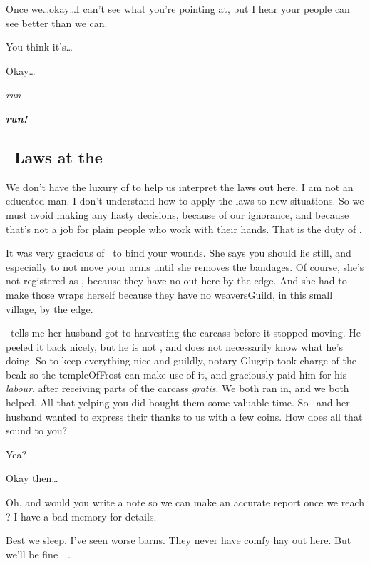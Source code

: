 Once we\ldots okay\ldots I can't see what you're pointing at, but I hear your people can see better than we can.

You think it's\ldots

\noindent
Okay\ldots

\hspace{3em}\emph{run-}

\hspace{6em}\emph{\bfseries run!}

\subsection{~Laws at the }

We don't have the luxury of  to help us interpret the laws out here.
I am not an educated man.
I don't understand how to apply the laws to new situations.
So we must avoid making any hasty decisions, because of our ignorance, and because that's not a job for plain people who work with their hands.
That is the duty of .

It was very gracious of \composeHumanName\ to bind your wounds.
She says you should lie still, and especially to not move your arms until she removes the bandages.
Of course, she's not registered as , because they have no  out here by the \gls{edge}.
And she had to make those wraps herself because they have no \gls{weaversGuild}, in this small \gls{village}, by the \gls{edge}.

\currentName\ tells me her husband got to \gls{harvesting} the carcass before it stopped moving.
He peeled it back nicely, but he is not , and does not necessarily know what he's doing.
So to keep everything nice and guildly, \Gls{notary} Glugrip took charge of the beak so the \gls{templeOfFrost} can make use of it, and graciously paid him for his \emph{labour}, after receiving parts of the carcass \emph{gratis}.
We both ran in, and we both helped.
All that yelping you did bought them some valuable time.
So \currentName\ and her husband wanted to express their thanks to us with a few \glspl{coin}.
How does all that sound to you?

Yea?

Okay then\ldots

Oh, and would you write a note so we can make an accurate report once we reach ?
I have a bad memory for details.

Best we sleep.
I've seen worse barns.
{
  \small
  They never have comfy hay out here.
  But \footnotesize we'll \scriptsize be fine~~\ldots
}

